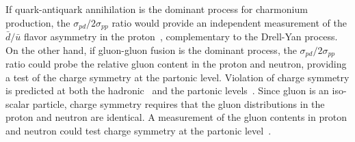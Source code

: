 \documentclass[../main.tex]{subfiles}
\begin{document}
If quark-antiquark annihilation is the dominant process for charmonium
production, the $\sigma_{pd}/2\sigma_{pp}$ ratio would provide an
independent measurement of the $\bar{d}/ \bar{u}$ flavor asymmetry in the
proton~\cite{peng1995}, complementary to the Drell-Yan process.
On the other hand, if gluon-gluon fusion is the dominant process, the
$\sigma_{pd}/2\sigma_{pp}$ ratio could probe the relative gluon content
in the proton and neutron, providing a test of the charge symmetry at the partonic level.
Violation of charge symmetry is predicted at both the hadronic~\cite{stephenson2003,opper2003}
and the partonic levels~\cite{londergan2010}. Since gluon is an iso-scalar particle,
charge symmetry requires that the gluon distributions in the proton and neutron
are identical. A measurement of the gluon contents in proton and neutron could test charge symmetry at
the partonic level~\cite{piller1996,zhu2008,lansberg2012}.
\end{document}
